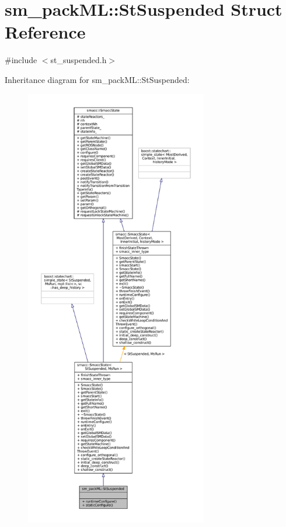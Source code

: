 \hypertarget{structsm__packML_1_1StSuspended}{}\section{sm\+\_\+pack\+ML\+:\+:St\+Suspended Struct Reference}
\label{structsm__packML_1_1StSuspended}


{\ttfamily \#include $<$st\+\_\+suspended.\+h$>$}



Inheritance diagram for sm\+\_\+pack\+ML\+:\+:St\+Suspended\+:
\nopagebreak
\begin{figure}[H]
\begin{center}
\leavevmode
\includegraphics[height=550pt]{structsm__packML_1_1StSuspended__inherit__graph}
\end{center}
\end{figure}


